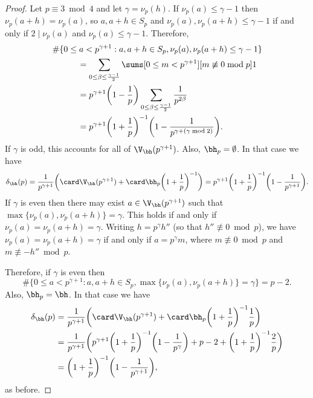 \documentclass[12pt, reqno, twoside, letterpaper]{amsart}
\begin{document}
\begin{nix}
\begin{proof}
Let $p \equiv 3 \bmod 4$ and let $\gamma = \nu_p(h)$.
%
If $\nu_p(a) \le \gamma - 1$ then $\nu_p(a + h) = \nu_p(a)$, so 
$a,a + h \in S_p$ and $\nu_p(a),\nu_p(a + h) \le \gamma - 1$ if 
and only if $2 \mid \nu_p(a)$ and $\nu_p(a) \le \gamma - 1$.
%
Therefore,
\begin{align*}
 & \#\{0 \le a < p^{\gamma + 1} : a,a + h \in S_p, \nu_p(a),\nu_p(a + h) \le \gamma - 1\}
  \\
 & \hspace{30pt}  = 
    \sum_{0 \le \beta \le \frac{\gamma - 1}{2}}
     \sums[0 \le m < p^{\gamma + 1}][m \not\equiv 0 \bmod p] 1
  \\
  & \hspace{30pt} = 
     p^{\gamma + 1}
      \bigg(1 - \frac{1}{p}\bigg)
       \sum_{0 \le \beta \le \frac{\gamma - 1}{2}}
        \frac{1}{p^{2\beta}}
  \\
  & \hspace{30pt} = 
   p^{\gamma + 1}
    \bigg(1 + \frac{1}{p}\bigg)^{-1}
     \bigg(1 - \frac{1}{p^{\gamma + (\gamma \bmod 2)}}\bigg).
\end{align*}
%
If $\gamma$ is odd, this accounts for all of 
$\V_{\bh}(p^{\gamma + 1})$.
%
Also, $\bh_p = \emptyset$.
%
In that case we have  
\[
 \delta_{\bh}(p)
  =
   \frac{1}{p^{\gamma + 1}}
    \bigg(
     \card \V_{\bh}(p^{\gamma + 1}) + \card \bh_p\bigg(1 + \frac{1}{p}\bigg)^{-1} 
    \bigg)
     =
      p^{\gamma + 1}
    \bigg(1 + \frac{1}{p}\bigg)^{-1}
     \bigg(1 - \frac{1}{p^{\gamma + 1}}\bigg).
\]
%
If $\gamma$ is even then there may exist 
$a \in \V_{\bh}(p^{\gamma + 1})$ such that  
$\max\{\nu_p(a),\nu_p(a + h)\} = \gamma$.
%
This holds if and only if 
$\nu_p(a) = \nu_p(a + h) = \gamma$.
%
Writing $h = p^{\gamma}h''$ (so that $h'' \not\equiv 0 \bmod p$), 
we have $\nu_p(a) = \nu_p(a + h) = \gamma$ if and only if 
$a = p^{\gamma}m$, where 
$m \not\equiv 0 \bmod p$ and $m \not\equiv - h'' \bmod p$.

Therefore, if $\gamma$ is even then  
\[
 \#\{0 \le a < p^{\gamma + 1} : a, a + h \in S_p, \max\{\nu_p(a),\nu_p(a + h)\} = \gamma\}
  =
   p - 2.
\]
%
Also, $\bh_p = \bh$.
%
In that case we have 
\begin{align*}
 \delta_{\bh}(p) 
  & =
   \frac{1}{p^{\gamma + 1}}
    \bigg(
     \card \V_{\bh}(p^{\gamma + 1}) + \card \bh_p\bigg(1 + \frac{1}{p}\bigg)^{-1}\frac{1}{p}
    \bigg)
  \\
  & =
      \frac{1}{p^{\gamma + 1}}
       \bigg(
        p^{\gamma + 1}
         \bigg(1 + \frac{1}{p}\bigg)^{-1}
          \bigg(1 - \frac{1}{p^{\gamma}}\bigg)
           +
            p - 2
             + 
              \bigg(1 + \frac{1}{p}\bigg)^{-1}
               \frac{2}{p}
       \bigg)
  \\
  & = 
   \bigg(1 + \frac{1}{p}\bigg)^{-1}
    \bigg(1 - \frac{1}{p^{\gamma + 1}}\bigg),
\end{align*}
as before.


\end{proof}
\end{nix}
\end{document}
